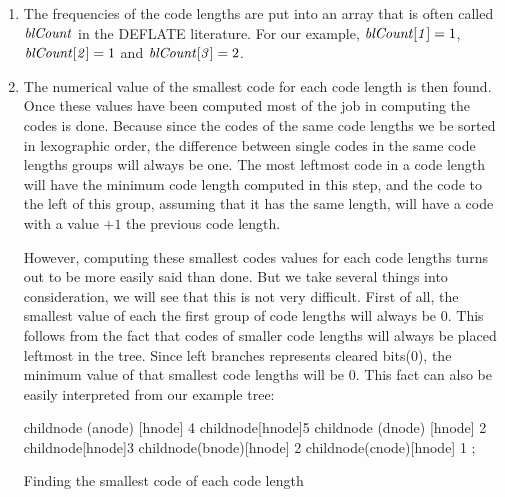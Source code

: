 \begin{enumerate}
\item The frequencies of the code lengths are put into an array that
  is often called $\mathit{blCount}$ in the DEFLATE literature. For our
  example, $\mathit{blCount[1]} = 1$, $\mathit{blCount[2]} = 1$ and
  $\mathit{blCount[3]} = 2$.

\item The numerical value of the smallest code for each code length is then
  found. Once these values have been computed most of the job in
  computing the codes is done. Because since the codes of the same
  code lengths we be sorted in lexographic order, the difference
  between single codes in the same code lengths groups will always be
  one. The most leftmost code in a code length will have the minimum
  code length computed in this step, and the code to the left of this
  group, assuming that it has the same length, will have a code with a
  value $+1$ the previous code length.

  However, computing these smallest codes values for each code lengths
  turns out to be more easily said than done. But we take several
  things into consideration, we will see that this is not very
  difficult. First of all, the smallest value of each the first group
  of code lengths will always be $0$. This follows from the fact that
  codes of smaller code lengths will always be placed leftmost in the
  tree. Since left branches represents cleared bits($0$), the minimum
  value of that smallest code lengths will be $0$. This fact can also
  be easily interpreted from our example tree:

\begin{huffmanc}
  child{node (anode) [hnode] {4}}
  child{node[hnode]{5}
    child{node (dnode) [hnode] {2}}
    child{node[hnode]{3}
      child{node(bnode)[hnode] {2}}
      child{node(cnode)[hnode] {1}}
    }};

\end{huffmanc}


  \begin{algorithm}[H]
    \caption{Finding the smallest code of each code length}
    \label{alg:smallest-code-length}
    \begin{algorithmic}[1]
      \EndForTo
    \end{algorithmic}
  \end{algorithm}


\end{enumerate}
